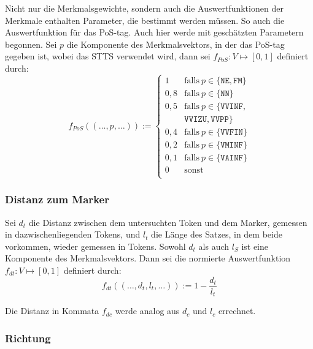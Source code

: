 \documentclass{article}
\begin{document}
Nicht nur die Merkmalsgewichte, sondern auch die Auswertfunktionen der
Merkmale enthalten Parameter, die bestimmt werden müssen. So auch die
Auswertfunktion für das PoS-tag. Auch hier werde mit geschätzten
Parametern begonnen.  Sei $p$ die Komponente des Merkmalsvektors, in
der das PoS-tag gegeben ist, wobei das STTS \parencite{Schiller1999a}
verwendet wird, dann sei $f_{PoS}:V\mapsto [0,1]$ definiert durch:
\begin{equation}
  \label{eq:pos}
  f_{PoS}((\dots,p,\dots)) := \left\{
    \begin{array}{ll}
      1 & \mathrm{falls~} p \in \{\mathtt{NE,FM}\} \\
      0,8 & \mathrm{falls~} p \in \{\mathtt{NN}\} \\
      0,5 & \mathrm{falls~} p \in \{\mathtt{VVINF,}\\ ~ & \mathtt{VVIZU,VVPP}\} \\
      0,4 & \mathrm{falls~} p \in \{\mathtt{VVFIN}\} \\
      0,2 & \mathrm{falls~} p \in \{\mathtt{VMINF}\} \\
      0,1 & \mathrm{falls~} p \in \{\mathtt{VAINF}\} \\
      0 & \mathrm{sonst} \\
    \end{array}\right.
\end{equation}


\subsubsection{Distanz zum Marker}

Sei $d_t$ die Distanz zwischen dem untersuchten Token und dem Marker,
gemessen in dazwischenliegenden Tokens, und $l_t$ die Länge des
Satzes, in dem beide vorkommen, wieder gemessen in Tokens. Sowohl
$d_t$ als auch $l_S$ ist eine Komponente des Merkmalsvektors. Dann sei
die normierte Auswertfunktion $f_{dt}:V\mapsto [0,1]$ definiert durch:
\begin{equation}
  \label{eq:tokendistance}
  f_{dt}((\dots,d_t,l_t,\dots)):=1-\frac{d_t}{l_t} 
\end{equation}

Die Distanz in Kommata $f_{dc}$ werde analog aus $d_c$ und $l_c$
errechnet.


\subsubsection{Richtung}
\end{document}
